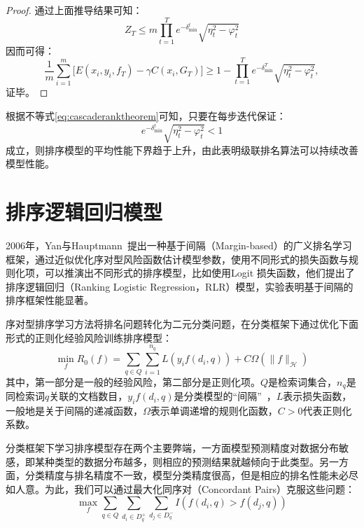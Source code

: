 \begin{proof}
通过上面推导结果可知：
\begin{equation}
    Z_T \le m \prod\limits_{t=1}^T e^{-\delta_{\min}^t} \sqrt{\eta_t^2 - \varphi_t^2}
\end{equation}
因而可得：
\begin{equation}\label{eq:cascaderanktheorem}
    \frac{1}{m} \sum\limits_{i=1}^m \bigg[E(x_i, y_i, f_T) - \gamma C(x_i, G_T)\bigg] \ge 1- \prod\limits_{t=1}^T e^{-\delta_{\min}^T}  \sqrt{\eta_t^2 - \varphi_t^2},
\end{equation}
证毕。
\end{proof}

根据不等式\eqref{eq:cascaderanktheorem}可知，只要在每步迭代保证：
\[
    e^{-\delta_{\min}^t}  \sqrt{\eta_t^2 - \varphi_t^2} < 1
\]
成立，则排序模型的平均性能下界趋于上升，由此表明级联排名算法可以持续改善模型性能。

\section{排序逻辑回归模型}
2006年，Yan与Hauptmann~\cite{yan2006efficient}提出一种基于间隔（Margin-based）的广义排名学习框架，通过近似优化序对型风险函数估计模型参数，使用不同形式的损失函数与规则化项，可以推演出不同形式的排序模型，比如使用Logit 损失函数，他们提出了排序逻辑回归（Ranking Logistic Regression，RLR）模型，实验表明基于间隔的排序框架性能显著。

序对型排序学习方法将排名问题转化为二元分类问题，在分类框架下通过优化下面形式的正则化经验风险训练排序模型：
\begin{equation}
    \min\limits_{f} R_0(f) = \sum\limits_{q\in Q} \sum\limits_{i=1}^{n_q} L(y_i f(d_i,q)) + C\Omega(\|f\|_{\mathcal{H}})
\end{equation}
其中，第一部分是一般的经验风险，第二部分是正则化项。$Q$是检索词集合，$n_q$是同检索词$q$关联的文档数目，$y_i f(d_i,q)$是分类模型的“间隔”~\cite{hastie2009elements}，$L$表示损失函数，一般地是关于间隔的递减函数，$\Omega$表示单调递增的规则化函数，$C>0$代表正则化系数。

分类框架下学习排序模型存在两个主要弊端，一方面模型预测精度对数据分布敏感，即某种类型的数据分布越多，则相应的预测结果就越倾向于此类型。另一方面，分类精度与排名精度不一致，模型分类精度很高，但是相应的排名性能未必尽如人意。为此，我们可以通过最大化同序对（Concordant Pairs）克服这些问题：
\begin{equation}
    \max\limits_f  \sum\limits_{q\in Q} \sum\limits_{d_i\in D_q^+} \sum\limits_{d_j\in D_q^-} I(f(d_i,q)>f(d_j,q))
\end{equation}

